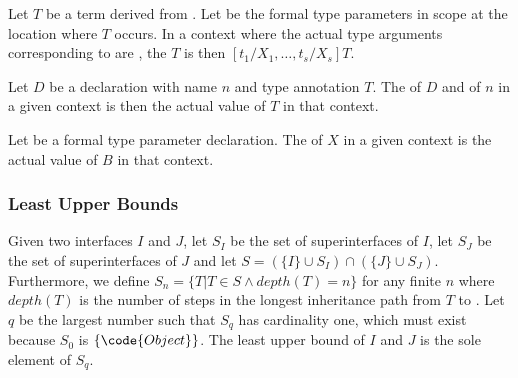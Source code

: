 \documentclass[makeidx]{article}
\begin{document}
{\LMHash{}%
Let $T$ be a term derived from .
Let  be the formal type parameters in scope
at the location where $T$ occurs.
In a context where the actual type arguments corresponding to
 are ,
the  $T$ is then
$[t_1/X_1, \ldots, t_s/X_s]T$.

\LMHash{}%
Let $D$ be a declaration with name $n$ and type annotation $T$.
The  of $D$ and of $n$ in a given context is
then the actual value of $T$ in that context.


\LMHash{}%
Let  be a formal type parameter declaration.
The  of $X$ in a given context is
the actual value of $B$ in that context.



\subsubsection{Least Upper Bounds}


\LMHash{}%
Given two interfaces $I$ and $J$,
let $S_I$ be the set of superinterfaces of $I$,
let $S_J$ be the set of superinterfaces of $J$
and let $S = (\{I\} \cup S_I) \cap (\{J\} \cup S_J)$.
Furthermore,
we define $S_n = \{T | T \in S \wedge depth(T) = n\}$ for any finite $n$
where $depth(T)$ is the number of steps in the longest inheritance path
from $T$ to .
Let $q$ be the largest number such that $S_q$ has cardinality one,
which must exist because $S_0$ is $\{\code{Object}\}$.
The least upper bound of $I$ and $J$ is the sole element of $S_q$.

}
\end{document}
